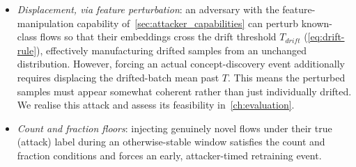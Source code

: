 \begin{itemize}
    \item \textit{Displacement, via feature perturbation}: an adversary with the feature-manipulation capability of~\cref{sec:attacker_capabilities} can perturb known-class flows so that their embeddings cross the drift threshold $T_{drift}$ (\cref{eq:drift-rule}), effectively manufacturing drifted samples from an unchanged distribution. However, forcing an actual concept-discovery event additionally requires displacing the drifted-batch mean past $T$. This means the perturbed samples must appear somewhat coherent rather than just individually drifted. We realise this attack and assess its feasibility in~\cref{ch:evaluation}.
    \item \textit{Count and fraction floors}: injecting genuinely novel flows under their true (attack) label during an otherwise-stable window satisfies the count and fraction conditions and forces an early, attacker-timed retraining event.
\end{itemize}

